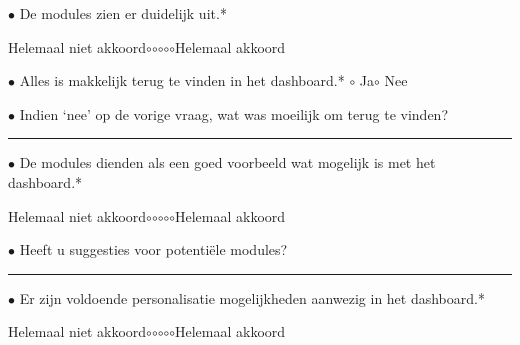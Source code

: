     \noindent \(\bullet\) De modules zien er duidelijk uit.*
    \vspace{-6pt}
    \begin{center}
    Helemaal niet akkoord\hspace{10pt}\(\circ\)\hspace{20pt}\(\circ\)\hspace{20pt}\(\circ\)\hspace{20pt}\(\circ\)\hspace{20pt}\(\circ\)\hspace{10pt}Helemaal akkoord
    \end{center}

    \noindent \(\bullet\) Alles is makkelijk terug te vinden in het dashboard.*\hspace{10pt} \(\circ\) Ja\hspace{10pt}\(\circ\) Nee\medskip

    \noindent \(\bullet\) Indien `nee' op de vorige vraag, wat was moeilijk om terug te vinden?\hspace{6pt}\rule{0.1\textwidth}{0.4pt}\medskip

    \noindent \(\bullet\) De modules dienden als een goed voorbeeld wat mogelijk is met het\newline
    \hspace*{9pt}dashboard.*
    \vspace{-6pt}
    \begin{center}
    Helemaal niet akkoord\hspace{10pt}\(\circ\)\hspace{20pt}\(\circ\)\hspace{20pt}\(\circ\)\hspace{20pt}\(\circ\)\hspace{20pt}\(\circ\)\hspace{10pt}Helemaal akkoord
    \end{center}

    \noindent \(\bullet\) Heeft u suggesties voor potenti\"{e}le modules?\hspace{6pt}\rule{0.3\textwidth}{0.4pt}\medskip

    \noindent \(\bullet\) Er zijn voldoende personalisatie mogelijkheden aanwezig in het dashboard.*
    \vspace{-6pt}
    \begin{center}
    Helemaal niet akkoord\hspace{10pt}\(\circ\)\hspace{20pt}\(\circ\)\hspace{20pt}\(\circ\)\hspace{20pt}\(\circ\)\hspace{20pt}\(\circ\)\hspace{10pt}Helemaal akkoord
    \end{center}

